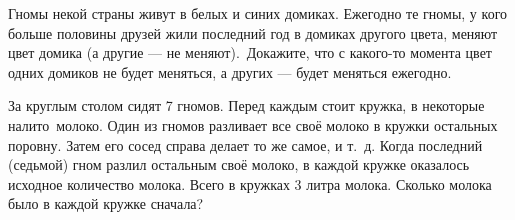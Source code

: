 \documentclass[a4paper,12pt]{article}
\begin{document}
Гномы некой страны живут в белых и синих домиках. Ежегодно
те гномы, у кого больше половины друзей жили последний год в домиках другого цвета, меняют цвет домика (а другие --- не меняют).~Дока\-жите, что с какого-то момента цвет одних
домиков %
не будет меняться,
а других --- будет меняться ежегодно. %



За круглым столом сидят 7 гномов. Перед каждым стоит кружка,
в некоторые налито~молоко. Один из гномов разливает
все своё молоко в кружки остальных поровну. Затем его сосед справа
делает то же самое, и т.~д. Когда последний (седьмой) гном разлил остальным своё молоко, в каждой кружке оказалось исходное количество молока. Всего в кружках 3 литра молока. Сколько молока было в каждой кружке сначала?
\end{document}
